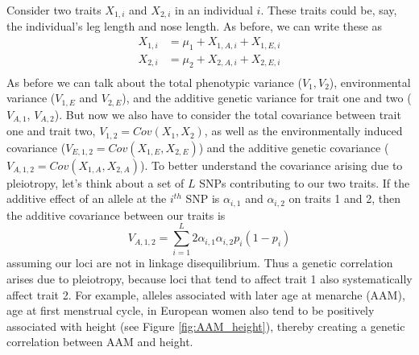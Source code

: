Consider two traits $X_{1,i}$ and $X_{2,i}$ in an individual $i$. These traits could be,
say, the individual's leg length and nose length. As before, we can write
these as 
\begin{eqnarray}
X_{1,i} &= \mu_1+ X_{1,A,i} + X_{1,E,i}  \nonumber \\
X_{2,i} &= \mu_2 +X_{2,A,i} + X_{2,E,i} \nonumber \\
\end{eqnarray}
As before we can talk about the total phenotypic variance ($V_1,V_2$),
environmental variance  ($V_{1,E}$ and $V_{2,E}$), and the additive genetic variance for trait one and two ($V_{A,1}$, $V_{A,2}$). But now we also have to consider the 
total covariance between trait one and trait two, $V_{1,2}=Cov(X_{1},X_{2})$, as well as the environmentally induced covariance ($V_{E,1,2}=Cov(X_{1,E}
,X_{2,E} )$) and the additive genetic covariance ($V_{A,1,2}
=Cov(X_{1,A} ,X_{2,A} )$). To better understand the covariance arising due to pleiotropy, let's think about a set of $L$ SNPs contributing to our two traits. If the additive effect of an allele at the $i^{th}$ SNP is $\alpha_{i,1}$ and $\alpha_{i,2}$ on traits 1 and 2, then the additive covariance between our traits is
\begin{equation}
V_{A,1,2} = \sum_{i=1}^L 2\alpha_{i,1}\alpha_{i,2} p_i(1-p_i)
\end{equation}
assuming our loci are not in linkage disequilibrium. Thus a genetic
correlation arises due to pleiotropy, because loci that tend to affect
trait 1 also systematically affect trait 2. For example, alleles
associated with later age at menarche (AAM), age at first menstrual cycle, in European women also
tend to be positively associated with height (see Figure
\ref{fig:AAM_height}), thereby creating a genetic correlation between
AAM and height. 


